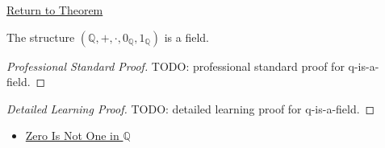 \newpage
{}
\label{prf:q-is-a-field}

\begin{remark*}[Return]
\hyperref[thm:q-is-a-field]{Return to Theorem}
\end{remark*}

\begin{theorem*}[$Q$ Is a Field]
The structure $(\mathbb{Q},+,\cdot,0_{\mathbb{Q}},1_{\mathbb{Q}})$ is a field.
\end{theorem*}

\begin{proof}[Professional Standard Proof]
\LRAProofBodyStart
TODO: professional standard proof for q-is-a-field.
\end{proof}

\begin{proof}[Detailed Learning Proof]
\LRAProofBodyStart
TODO: detailed learning proof for q-is-a-field.
\end{proof}

\begin{remark*}
\end{remark*}

\begin{dependencies}
\begin{itemize}
  \item \hyperref[thm:zero-not-one-in-q]{Zero Is Not One in $\mathbb{Q}$}
\end{itemize}
\end{dependencies}

\clearpage

